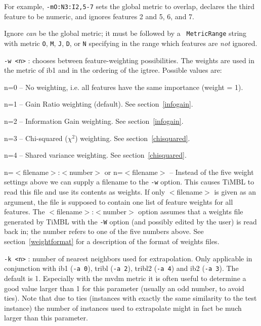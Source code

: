 \documentclass{report}
\begin{document}
\begin{description}
For example, {\tt -mO:N3:I2,5-7} sets the global metric to overlap,
declares the third feature to be numeric, and ignores features 2 and
5, 6, and 7.

Ignore {\em can}\/ be the global metric; it must be followed by a {\tt
  MetricRange} string with metric {\tt O}, {\tt M}, {\tt J}, {\tt D},
or {\tt N} specifying in the range which features are {\em not}\/
ignored.

\item {\tt -w <n>} : chooses between feature-weighting possibilities.
The weights are used in the metric of {\sc ib1} and in the ordering of the
{\sc igtree}. Possible values are:

	\begin{description}
	\item n=0 -- No weighting, i.e. all features have the same
	importance (weight = 1).
	\item n=1 -- Gain Ratio weighting (default). See section~\ref{infogain}.
	\item n=2 -- Information Gain weighting. See section~\ref{infogain}.
	\item n=3 -- Chi-squared ($\chi^2$) weighting. See section~\ref{chisquared}.
	\item n=4 -- Shared variance weighting. See section~\ref{chisquared}.
	\item n=$<$filename$>$:$<$number$>$ or n=$<$filename$>$ --
          Instead of the five weight settings above we can supply a
          filename to the {\tt -w} option. This causes TiMBL to read
          this file and use its contents as weights. If only
          $<$filename$>$ is given as an argument, the file is supposed
          to contain one list of feature weights for all features. The
          $<$filename$>$:$<$number$>$ option assumes that a weights
          file generated by TiMBL with the {\tt -W} option (and
          possibly edited by the user) is read back in; the number
          refers to one of the five numbers above. See
          section~\ref{weightformat} for a description of the format
          of weights files.
	\end{description}

\item {\tt -k <n>} : number of nearest neighbors used for
        extrapolation. Only applicable in conjunction with {\sc ib1}
        ({\tt -a 0}), {\sc tribl} ({\tt -a 2}), {\sc tribl2} ({\tt -a
          4}) and {\sc ib2} ({\tt -a 3}). The default is 1. Especially
        with the {\sc mvdm} metric it is often useful to determine a
        good value larger than 1 for this parameter (usually an odd
        number, to avoid ties). Note that due to ties (instances with
        exactly the same similarity to the test instance) the number
        of instances used to extrapolate might in fact be much larger
        than this parameter.


\end{description}
\end{document}
